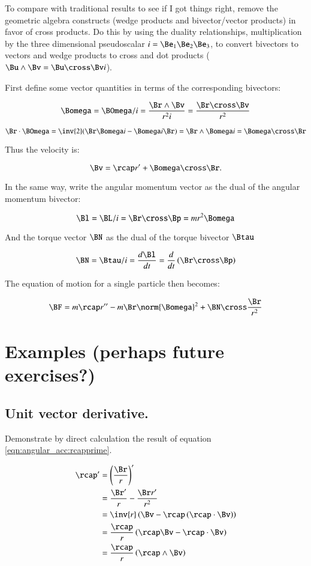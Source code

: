 To compare with traditional results to see if I got things right, remove the geometric algebra constructs
(wedge products and bivector/vector products) in favor of cross products.  Do this by 
using the duality relationships, multiplication by the three dimensional pseudoscalar
$i = \Be_1\Be_2\Be_3$, to convert bivectors to vectors and wedge products to cross and dot products
($\Bu \wedge \Bv = \Bu \cross \Bv i$).

First define some vector quantities in terms of the corresponding bivectors:

\[
\Bomega = \BOmega / i = \frac{\Br \wedge \Bv}{r^2 i} = \frac{\Br \cross \Bv}{r^2}
\]

\[
\Br \cdot \BOmega = \inv{2}(\Br \Bomega i - \Bomega i \Br ) = \Br \wedge \Bomega i = \Bomega \cross \Br
\]

Thus the velocity is:

\[
\Bv = \rcap r' + \Bomega \cross \Br.
\]

In the same way, write the angular momentum vector as the dual of the angular momentum bivector:

\[
\Bl = \BL /i = \Br \cross \Bp = m r^2 \Bomega
\]

And the torque vector $\BN$ as the dual of the torque bivector $\Btau$

\[
\BN = \Btau /i = \frac{d\Bl}{dt} = \frac{d}{dt} \left(\Br \cross \Bp \right)
\]

The equation of motion for a single particle then becomes:

\[
\BF = m\rcap r'' - m \Br \norm{\Bomega}^2 + \BN \cross \frac{\Br}{r^2}
\]

\section{Examples (perhaps future exercises?) }

\subsection{Unit vector derivative. }

Demonstrate by direct calculation the result of equation \ref{eqn:angular_acc:rcapprime}.

\begin{align*}
\rcap' 
&= \left(\frac{\Br}{r}\right)' \\
&= \frac{\Br'}{r} - \frac{\Br r'}{r^2} \\
&= \inv{r} \left( \Bv - \rcap \left(\rcap \cdot \Bv \right) \right) \\
&= \frac{\rcap}{r} \left( \rcap \Bv - \rcap \cdot \Bv \right) \\
&= \frac{\rcap}{r} \left( \rcap \wedge \Bv \right) \\
\end{align*}

